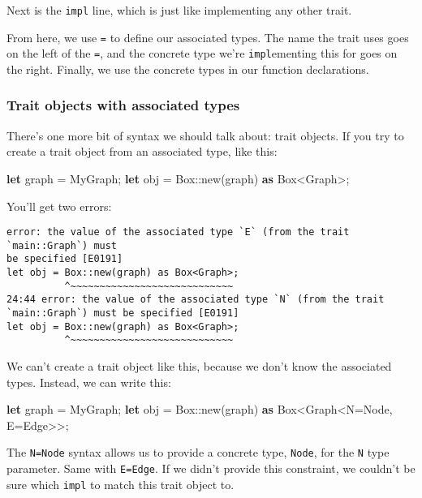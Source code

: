 \documentclass[a4paper,]{book}
\newenvironment{Shaded}{\begin{snugshade}}{\end{snugshade}}
\newcommand{\KeywordTok}[1]{\textcolor[rgb]{0.13,0.29,0.53}{\textbf{{#1}}}}
\newcommand{\NormalTok}[1]{{#1}}
\begin{document}
Next is the \texttt{impl} line, which is just like implementing any
other trait.

From here, we use \texttt{=} to define our associated types. The name
the trait uses goes on the left of the \texttt{=}, and the concrete type
we're \texttt{impl}ementing this for goes on the right. Finally, we use
the concrete types in our function declarations.

\subsubsection{Trait objects with associated
types}\label{trait-objects-with-associated-types}

There's one more bit of syntax we should talk about: trait objects. If
you try to create a trait object from an associated type, like this:

\begin{Shaded}
\begin{Highlighting}[]
\KeywordTok{let} \NormalTok{graph = MyGraph;}
\KeywordTok{let} \NormalTok{obj = Box::new(graph) }\KeywordTok{as} \NormalTok{Box<Graph>;}
\end{Highlighting}
\end{Shaded}

You'll get two errors:

\begin{verbatim}
error: the value of the associated type `E` (from the trait `main::Graph`) must
be specified [E0191]
let obj = Box::new(graph) as Box<Graph>;
          ^~~~~~~~~~~~~~~~~~~~~~~~~~~~~
24:44 error: the value of the associated type `N` (from the trait
`main::Graph`) must be specified [E0191]
let obj = Box::new(graph) as Box<Graph>;
          ^~~~~~~~~~~~~~~~~~~~~~~~~~~~~
\end{verbatim}

We can't create a trait object like this, because we don't know the
associated types. Instead, we can write this:

\begin{Shaded}
\begin{Highlighting}[]
\KeywordTok{let} \NormalTok{graph = MyGraph;}
\KeywordTok{let} \NormalTok{obj = Box::new(graph) }\KeywordTok{as} \NormalTok{Box<Graph<N=Node, E=Edge>>;}
\end{Highlighting}
\end{Shaded}

The \texttt{N=Node} syntax allows us to provide a concrete type,
\texttt{Node}, for the \texttt{N} type parameter. Same with
\texttt{E=Edge}. If we didn't provide this constraint, we couldn't be
sure which \texttt{impl} to match this trait object to.
\end{document}

